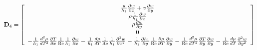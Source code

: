 \begin{equation*}
  {\bf{D}}_4  = \left[ {\begin{array}{*{20}c}
   {\frac{u}{{h_1 }}\frac{{\partial w}}{{\partial x}} + v\frac{{\partial w}}{{\partial y}}}  \\
   {\rho \frac{1}{{h_1 }}\frac{{\partial w}}{{\partial x}}}  \\
   {\rho \frac{{\partial w}}{{\partial y}}}  \\
   0  \\
   { - \frac{1}{{h_1 }}\frac{{d^2 \mu }}{{dT^2 }}\frac{{\partial T}}{{\partial x}}\frac{1}{{{\mathop{\rm Re}\nolimits} }}\frac{1}{{h_1 }}\frac{{\partial w}}{{\partial x}} - \frac{1}{{h_1 }}\frac{{d\mu }}{{dT}}\frac{1}{{{\mathop{\rm Re}\nolimits} }}\frac{1}{{h_1 }}\frac{{\partial ^2 w}}{{\partial x^2 }} - \frac{1}{{h_1 }}\frac{{\partial h_1 }}{{\partial y}}\frac{1}{{{\mathop{\rm Re}\nolimits} }}\frac{{\partial \mu }}{{\partial T}}\frac{{\partial w}}{{\partial y}} - \frac{1}{{{\mathop{\rm Re}\nolimits} }}\frac{{d^{\rm{2}} \mu }}{{dT^{\rm{2}} }}\frac{{\partial T}}{{\partial y}}\frac{{\partial w}}{{\partial y}} - \frac{1}{{{\mathop{\rm Re}\nolimits} }}\frac{{d\mu }}{{dT}}\frac{{\partial ^2 w}}{{\partial y^2 }}}  \\
\end{array}} \right]
\end{equation*}
